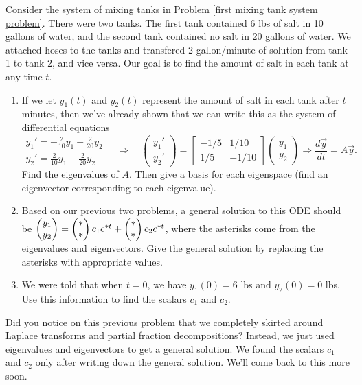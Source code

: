 \begin{problem}
Consider the system of mixing tanks in Problem \ref{first mixing tank system problem}.   
There were two tanks. The first tank contained 6 lbs of salt in 10 gallons of water, and the second tank contained no salt in 20 gallons of water. We attached hoses to the tanks and transfered 2 gallon/minute of solution from tank 1 to tank 2, and vice versa. Our goal is to find the amount of salt in each tank at any time $t$. 
\begin{enumerate}
 \item If we let $y_1(t)$ and $y_2(t)$ represent the amount of salt in each tank after $t$ minutes, then we've already shown that we can write this as the system of differential equations
$$
\begin{array}{l}
 y_1 ' = -\frac{2}{10}y_1+\frac{2}{20}y_2\\
 y_2 ' = \frac{2}{10}y_1-\frac{2}{20}y_2
\end{array}
\quad\Rightarrow\quad
\begin{pmatrix}
 y_1'\\y_2'
\end{pmatrix}
=
\begin{bmatrix}
 -1/5 & 1/10\\
 1/5 & -1/10
\end{bmatrix}
\begin{pmatrix}
 y_1\\y_2
\end{pmatrix}
\Rightarrow
\dfrac{d\vec{y}}{dt} =A\vec y. 
$$
Find the eigenvalues of $A$. Then give a basis for each eigenspace (find an eigenvector corresponding to each eigenvalue). 
\item 
Based on our previous two problems, a general solution to this ODE should be 
$\begin{pmatrix} y_1\\y_2 \end{pmatrix}  = \begin{pmatrix} *\\ * \end{pmatrix} c_1 e^{* t}+\begin{pmatrix} *\\ * \end{pmatrix} c_2 e^{* t}$, where the asterisks come from the eigenvalues and eigenvectors. Give the general solution by replacing the asterisks with appropriate values.
\item We were told that when $t=0$, we have $y_1(0)=6$ lbs and $y_2(0)=0$ lbs. Use this information to find the scalars $c_1$ and $c_2$.  
\end{enumerate}
\end{problem}

Did you notice on this previous problem that we  completely skirted around Laplace transforms and partial fraction decompositions?  Instead, we just used eigenvalues and eigenvectors to get a general solution. We found the scalars $c_1$ and $c_2$ only after writing down the general solution. We'll come back to this more soon. 
















